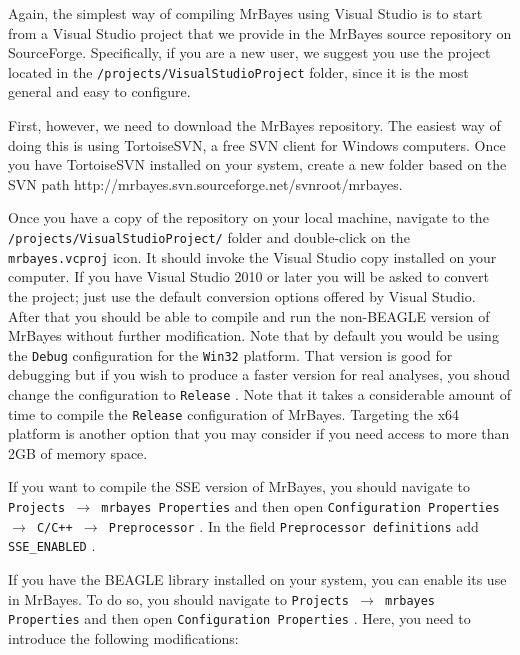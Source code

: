 \documentclass[12pt]{book}
\newcommand{\ttt}[1]{\texttt{#1} }
\begin{document}
Again, the simplest way of compiling MrBayes using Visual Studio is to start from a Visual Studio
project that we provide in the MrBayes source repository on SourceForge. Specifically, if you are a new
user, we suggest you use the project located in the \ttt{/projects/VisualStudioProject} folder, 
since it is the most general and easy to configure.

First, however, we need to download the MrBayes repository. The easiest way of doing this is using TortoiseSVN,
a free SVN client for Windows computers. Once you have TortoiseSVN installed on your system, create a new
folder based on the SVN path http://mrbayes.svn.sourceforge.net/svnroot/mrbayes.

Once you have a copy of the repository on your local machine, navigate to the \ttt{/projects/VisualStudioProject/}
folder and double-click on the \ttt{mrbayes.vcproj} icon. It should invoke the Visual Studio copy installed on your 
computer.  If you have Visual Studio 2010 or later you will be asked to convert the project; just use the default
conversion options offered by Visual Studio. After that you should be able to compile and run the non-BEAGLE
version of MrBayes without further modification. Note that by default you would be using the \ttt{Debug} 
configuration for the \ttt{Win32} platform.  That version is good for debugging but if you wish to produce a faster
version for real analyses, you shoud change the configuration to 
\ttt{Release}. Note that it takes a considerable amount of time to compile the \ttt{Release} configuration of 
MrBayes. Targeting the x64 platform is another option that you may consider if you need access to more than
2GB of memory space.

If you want to compile the SSE version of MrBayes, you should navigate to 
\ttt{Projects $\rightarrow$ mrbayes Properties} and then open \ttt{Configuration Properties $\rightarrow$ C/C++  
$\rightarrow$ Preprocessor}. In the field \ttt{Preprocessor definitions} add \ttt{SSE\_ENABLED}.

If you have the BEAGLE library installed on your system, you can enable its use in MrBayes. To do so, 
you should navigate to \ttt{Projects $\rightarrow$ mrbayes Properties} and then open
\ttt{Configuration Properties}. Here, you need to introduce the following modifications:
\end{document}
